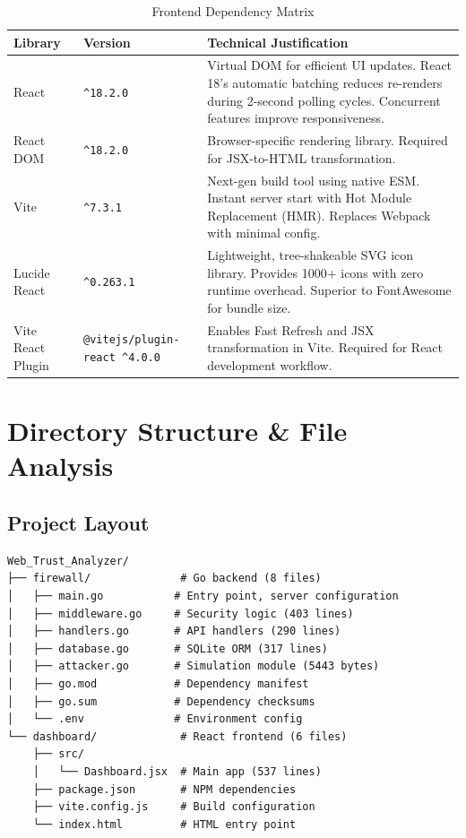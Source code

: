 \documentclass[11pt,a4paper]{report}
\begin{document}
\begin{table}[H]
\centering
\begin{tabular}{@{}lp{3cm}p{7.5cm}@{}}
\toprule
\textbf{Library} & \textbf{Version} & \textbf{Technical Justification} \\ \midrule
React & \texttt{\textasciicircum{}18.2.0} & Virtual DOM for efficient UI updates. React 18's automatic batching reduces re-renders during 2-second polling cycles. Concurrent features improve responsiveness. \\ \midrule
React DOM & \texttt{\textasciicircum{}18.2.0} & Browser-specific rendering library. Required for JSX-to-HTML transformation. \\ \midrule
Vite & \texttt{\textasciicircum{}7.3.1} & Next-gen build tool using native ESM. Instant server start with Hot Module Replacement (HMR). Replaces Webpack with minimal config. \\ \midrule
Lucide React & \texttt{\textasciicircum{}0.263.1} & Lightweight, tree-shakeable SVG icon library. Provides 1000+ icons with zero runtime overhead. Superior to FontAwesome for bundle size. \\ \midrule
Vite React Plugin & \texttt{@vitejs/plugin-react \textasciicircum{}4.0.0} & Enables Fast Refresh and JSX transformation in Vite. Required for React development workflow. \\ \bottomrule
\end{tabular}
\caption{Frontend Dependency Matrix}
\end{table}

\chapter{Directory Structure \& File Analysis}

\section{Project Layout}
\begin{verbatim}
Web_Trust_Analyzer/
├── firewall/              # Go backend (8 files)
│   ├── main.go           # Entry point, server configuration
│   ├── middleware.go     # Security logic (403 lines)
│   ├── handlers.go       # API handlers (290 lines)
│   ├── database.go       # SQLite ORM (317 lines)
│   ├── attacker.go       # Simulation module (5443 bytes)
│   ├── go.mod            # Dependency manifest
│   ├── go.sum            # Dependency checksums
│   └── .env              # Environment config
└── dashboard/             # React frontend (6 files)
    ├── src/
    │   └── Dashboard.jsx  # Main app (537 lines)
    ├── package.json       # NPM dependencies
    ├── vite.config.js     # Build configuration
    └── index.html         # HTML entry point
\end{verbatim}
\end{document}

